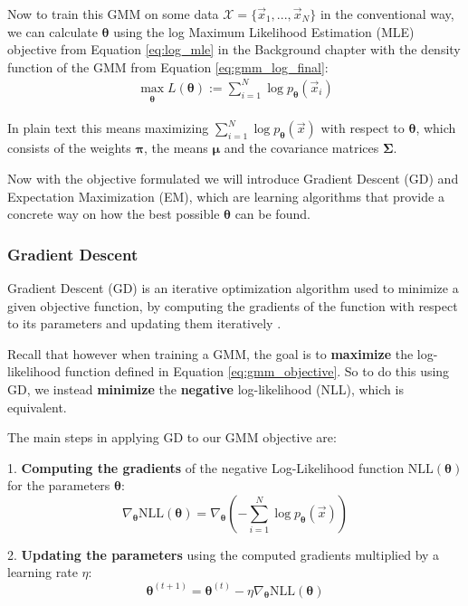 Now to train this GMM on some data $\mathcal{X} = \{\vec x_1, ..., \vec x_N\}$ in the conventional way, we can calculate $\boldsymbol{\theta}$ using the 
log Maximum Likelihood Estimation (MLE) objective from Equation \ref{eq:log_mle} in the Background chapter with the density function
of the GMM from Equation \ref{eq:gmm_log_final}:
\begin{align}
    \max_{\substack{\boldsymbol{\theta}}} L(\boldsymbol{\theta}) := \sum_{i=1}^{N} \log p_{\boldsymbol{\theta}}(\vec x_i)
    \label{eq:gmm_objective}
\end{align}

In plain text this means maximizing $\sum_{i=1}^{N} \log p_{\boldsymbol{\theta}}(\vec x)$ with respect to $\boldsymbol{\theta}$, which consists of the weights $\boldsymbol \pi$, the means $\boldsymbol \mu$ and the covariance matrices $\boldsymbol \Sigma$.

Now with the objective formulated we will introduce Gradient Descent (GD) and Expectation Maximization (EM), which are learning algorithms
that provide a concrete way on how the best possible $\boldsymbol{\theta}$ can be found. 

\subsubsection{Gradient Descent}
\label{sec:gmm_sgd}

Gradient Descent (GD) is an iterative optimization algorithm used to minimize a given objective function, by  
computing the gradients of the function with respect to its parameters and updating them iteratively \cite{deepl}.

Recall that however when training a GMM, the goal is to \textbf{maximize} the log-likelihood function defined in Equation \ref{eq:gmm_objective}. 
So to do this using GD, we instead \textbf{minimize} the \textbf{negative} log-likelihood (NLL), which is equivalent.

The main steps in applying GD to our GMM objective are: 

1. \textbf{Computing the gradients} of the negative Log-Likelihood function $\text{NLL}(\boldsymbol{\theta})$ for the parameters $\boldsymbol{\theta}$: 
\[
    \nabla_{\boldsymbol{\theta}} \text{NLL}(\boldsymbol{\theta}) = \nabla_{\boldsymbol{\theta}} (- \sum_{i=1}^{N} \log p_{\boldsymbol{\theta}}(\vec x))
\]

2. \textbf{Updating the parameters} using the computed gradients multiplied by a learning rate $\eta$:
\[
    \boldsymbol{\theta}^{(t+1)} = \boldsymbol{\theta}^{(t)} - \eta \nabla_{\boldsymbol{\theta}} \text{NLL}(\boldsymbol{\theta})
\]

